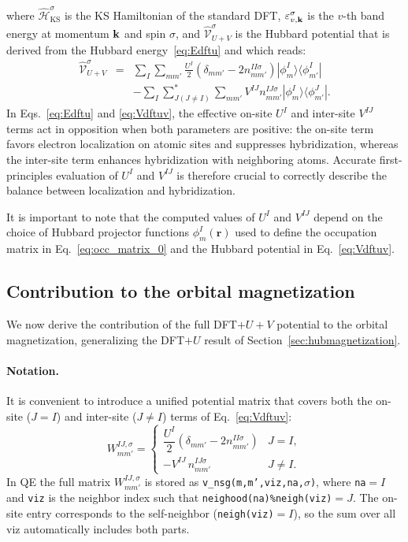 \documentclass[11pt]{article}
\begin{document}
%
where $\hat{\mathcal H}_\mathrm{KS}^\sigma$ is the KS Hamiltonian of the standard DFT, $\varepsilon_{v,{\bf k}}^\sigma$ is the $v$-th band energy at momentum ${\bf k}$ and spin $\sigma$, and $\hat{\mathcal V}_{U+V}^\sigma$ is the Hubbard potential that is derived from the Hubbard energy~\eqref{eq:Edftu} and which reads:
%
\begin{eqnarray} 
\hat{\mathcal V}_{U+V}^\sigma & = &
    \sum_{I}\sum_{mm'}\frac{U^I}{2}
    \left(
    \delta_{mm'}-2n^{II\sigma}_{mm'}
    \right) 
    |\phi^I_m\rangle
    \langle\phi^I_{m'}| \nonumber \\
    & & - \sum_{I} \sum_{J (J \ne I)}^{*}\sum_{mm'} V^{IJ} n^{IJ\sigma}_{mm'}
    |\phi^I_m\rangle
    \langle \phi^J_{m'}|.
    \label{eq:Vdftuv}
\end{eqnarray}
%
In Eqs.~\eqref{eq:Edftu} and \eqref{eq:Vdftuv}, the effective on-site $U^I$ and inter-site $V^{IJ}$ terms act in opposition when both parameters are positive: the on-site term favors electron localization on atomic sites and suppresses hybridization, whereas the inter-site term enhances hybridization with neighboring atoms. Accurate first-principles evaluation of $U^I$ and $V^{IJ}$ is therefore crucial to correctly describe the balance between localization and hybridization. 

It is important to note that the computed values of $U^I$ and $V^{IJ}$ depend on the choice of Hubbard projector functions $\phi^I_{m}(\mathbf{r})$ used to define the occupation matrix in Eq.~\eqref{eq:occ_matrix_0} and the Hubbard potential in Eq.~\eqref{eq:Vdftuv}. 

\subsection{Contribution to the orbital magnetization}

We now derive the contribution of the full DFT$+U+V$ potential to the orbital
magnetization, generalizing the DFT$+U$ result of
Section~\ref{sec:hubmagnetization}.

\paragraph{Notation.}
It is convenient to introduce a unified potential matrix that covers both the
on-site ($J=I$) and inter-site ($J\ne I$) terms of
Eq.~\eqref{eq:Vdftuv}:
\begin{equation}
  W_{mm'}^{IJ,\sigma}
  =
  \begin{cases}
    \dfrac{U^I}{2}\!\left(\delta_{mm'} - 2n_{mm'}^{II\sigma}\right)
    & J = I, \\[6pt]
    -V^{IJ}\,n_{mm'}^{IJ\sigma}
    & J \ne I.
  \end{cases}
  \label{eq:Wmat}
\end{equation}
In QE the full matrix $W_{mm'}^{IJ,\sigma}$ is stored as
\texttt{v\_nsg(m,m',viz,na,$\sigma$)}, where \texttt{na}$=I$ and
\texttt{viz} is the neighbor index such that
\texttt{neighood(na)\%neigh(viz)}$=J$.  The on-site entry corresponds to
the self-neighbor (\texttt{neigh(viz)}$=I$), so the sum over all viz
automatically includes both parts.
\end{document}
